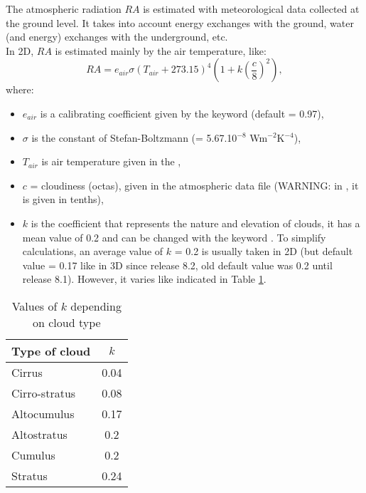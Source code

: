 The atmospheric radiation $RA$ is estimated with meteorological
data collected at the ground level.
It takes into account energy exchanges with the ground, water
(and energy) exchanges with the underground, etc.\\

In 2D, $RA$ is estimated mainly by the air temperature, like:
\begin{equation*}
RA=e_{air}\sigma\left(T_{air}+273.15 \right)^4\left(1+k\left(\frac{c}{8}\right)^2 \right),
\end{equation*}
where:
\begin{itemize}
\item $e_{air}$ is a calibrating coefficient given by the keyword
   (default = 0.97),
\item $\sigma$ is the constant of Stefan-Boltzmann (= 5.67.10$^{-8}$ Wm$^{-2}$K$^{-4}$),
\item $T_{air}$ is air temperature given in the ,
\item $c$ = cloudiness (octas), given in the atmospheric data file
(WARNING: in \khione, it is given in tenths),
\item $k$ is the coefficient that represents the nature and elevation of clouds,
it has a mean value of 0.2 and can be changed with the keyword
.
To simplify calculations, an average value of $k$ = 0.2 is usually taken in 2D
(but default value = 0.17 like in 3D since release 8.2,
old default value was 0.2 until release 8.1).
However, it varies like indicated in Table \ref{tab:kcloud}.
\end{itemize}

\begin{table}
  \centering
  \begin{tabular}{|l|c|}
     \hline
     Type of cloud & $k$ \\
     \hline \hline
     Cirrus & 0.04 \\
     Cirro-stratus & 0.08 \\
     Altocumulus & 0.17 \\
     Altostratus & 0.2 \\
     Cumulus & 0.2 \\
     Stratus & 0.24\\
     \hline
   \end{tabular}
  \caption{Values of $k$ depending on cloud type}\label{tab:kcloud}
\end{table}

